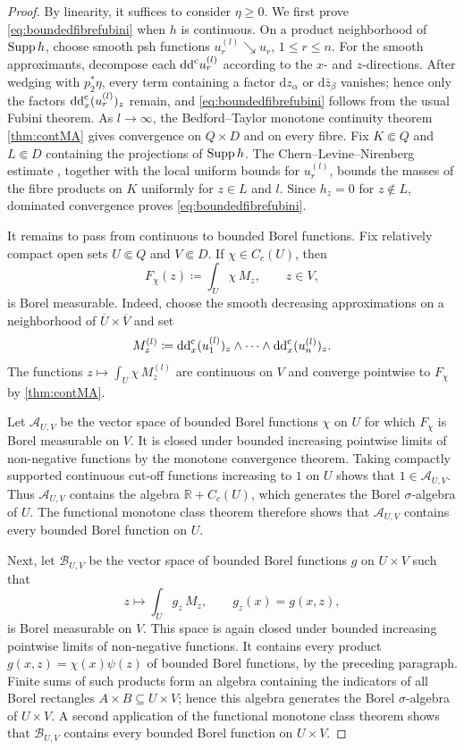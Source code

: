 \begin{proof}
    By linearity, it suffices to consider $\eta\geq0$.
    We first prove \eqref{eq:boundedfibrefubini} when $h$ is continuous.
    On a product neighborhood of $\operatorname{Supp} h$, choose smooth psh functions $u_r^{(l)}\searrow u_r$, $1\leq r\leq n$. For the smooth approximants, decompose each $\mathrm{dd}^{\mathrm{c}} u_r^{(l)}$ according to the $x$- and $z$-directions. After wedging with $p_2^*\eta$, every term containing a factor $\mathrm{d}z_\alpha$ or $\mathrm{d}\bar z_\beta$ vanishes; hence only the factors $\mathrm{dd}^{\mathrm{c}}_x(u_r^{(l)})_z$ remain, and \eqref{eq:boundedfibrefubini} follows from the usual Fubini theorem. As $l\to\infty$, the Bedford--Taylor monotone continuity theorem \cref{thm:contMA} gives convergence on $Q\times D$ and on every fibre. Fix $K\Subset Q$ and $L\Subset D$ containing the projections of $\operatorname{Supp} h$. The Chern--Levine--Nirenberg estimate \cite[Theorem~3.9]{GZ17}, together with the local uniform bounds for $u_r^{(l)}$, bounds the masses of the fibre products on $K$ uniformly for $z\in L$ and $l$. Since $h_z=0$ for $z\notin L$, dominated convergence proves \eqref{eq:boundedfibrefubini}.

    It remains to pass from continuous to bounded Borel functions. Fix relatively compact open sets $U\Subset Q$ and $V\Subset D$. If $\chi\in C_c(U)$, then
    \[
        F_\chi(z)\coloneqq\int_U\chi\,M_z,
        \qquad z\in V,
    \]
    is Borel measurable. Indeed, choose the smooth decreasing approximations on a neighborhood of $\overline U\times\overline V$ and set
    \[
        M_z^{(l)}\coloneqq
        \mathrm{dd}^{\mathrm{c}}_x(u_1^{(l)})_z\wedge\cdots\wedge\mathrm{dd}^{\mathrm{c}}_x(u_n^{(l)})_z.
    \]
    The functions $z\mapsto\int_U\chi\,M_z^{(l)}$ are continuous on $V$ and converge pointwise to $F_\chi$ by \cref{thm:contMA}.

    Let $\mathcal{A}_{U,V}$ be the vector space of bounded Borel functions $\chi$ on $U$ for which $F_\chi$ is Borel measurable on $V$. It is closed under bounded increasing pointwise limits of non-negative functions by the monotone convergence theorem. Taking compactly supported continuous cut-off functions increasing to $1$ on $U$ shows that $1\in\mathcal{A}_{U,V}$. Thus $\mathcal{A}_{U,V}$ contains the algebra $\mathbb{R}+C_c(U)$, which generates the Borel $\sigma$-algebra of $U$. The functional monotone class theorem therefore shows that $\mathcal{A}_{U,V}$ contains every bounded Borel function on $U$.

    Next, let $\mathcal{B}_{U,V}$ be the vector space of bounded Borel functions $g$ on $U\times V$ such that
    \[
        z\longmapsto\int_U g_z\,M_z,
        \qquad g_z(x)=g(x,z),
    \]
    is Borel measurable on $V$. This space is again closed under bounded increasing pointwise limits of non-negative functions. It contains every product $g(x,z)=\chi(x)\psi(z)$ of bounded Borel functions, by the preceding paragraph. Finite sums of such products form an algebra containing the indicators of all Borel rectangles $A\times B\subseteq U\times V$; hence this algebra generates the Borel $\sigma$-algebra of $U\times V$. A second application of the functional monotone class theorem shows that $\mathcal{B}_{U,V}$ contains every bounded Borel function on $U\times V$.


\end{proof}
